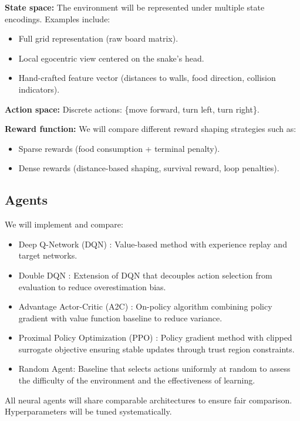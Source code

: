 \documentclass[10pt,twocolumn,letterpaper]{article}
\begin{document}
\textbf{State space:} The environment will be represented under multiple state encodings. Examples include:
\begin{itemize}
    \item Full grid representation (raw board matrix).
    \item Local egocentric view centered on the snake's head.
    \item Hand-crafted feature vector (distances to walls, food direction, collision indicators).
\end{itemize}

\textbf{Action space:} Discrete actions: \{move forward, turn left, turn right\}.

\textbf{Reward function:} We will compare different reward shaping strategies such as:
\begin{itemize}
    \item Sparse rewards (food consumption + terminal penalty).
    \item Dense rewards (distance-based shaping, survival reward, loop penalties).
\end{itemize}

\subsection{Agents}

We will implement and compare:

\begin{itemize}
    \item Deep Q-Network (DQN) \cite{mnih2015human}: Value-based method with experience replay and target networks. 
    \item Double DQN \cite{van2016deep}: Extension of DQN that decouples action selection from evaluation to reduce overestimation bias.
    \item Advantage Actor-Critic (A2C) \cite{mnih2016asynchronous}: On-policy algorithm combining policy gradient with value function baseline to reduce variance.
    \item Proximal Policy Optimization (PPO) \cite{schulman2017proximal}: Policy gradient method with clipped surrogate objective ensuring stable updates through trust region constraints.
    \item Random Agent: Baseline that selects actions uniformly at random to assess the difficulty of the environment and the effectiveness of learning.
\end{itemize}

All neural agents will share comparable architectures to ensure fair comparison. Hyperparameters will be tuned systematically.
\end{document}
